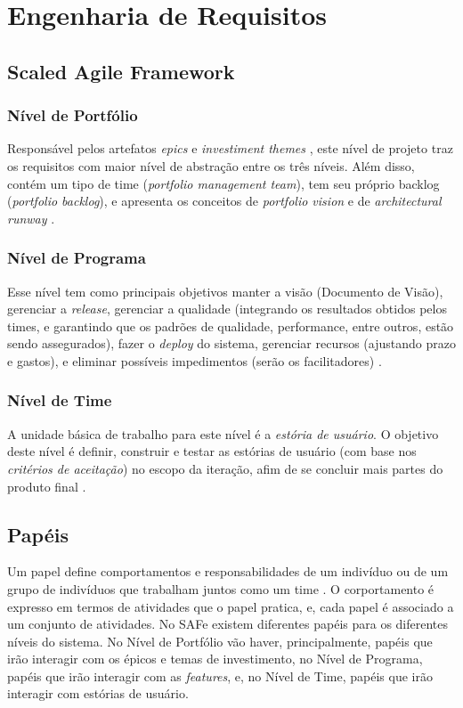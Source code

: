 \chapter[Engenharia de Requisitos]{Engenharia de Requisitos}

\section{Scaled Agile Framework}
\subsection{Nível de Portfólio}
Responsável pelos artefatos \emph{epics} e \emph{investiment themes} \cite[p. 227-228]{safe005}, este nível de projeto traz os requisitos com maior nível de abstração entre os três níveis. Além disso, contém um tipo de time (\emph{portfolio management team}), tem seu próprio backlog (\emph{portfolio backlog}), e apresenta os conceitos de \emph{portfolio vision} e de \emph{architectural runway} \cite[p. 227-228]{safe005}.

\subsection{Nível de Programa}
Esse nível tem como principais objetivos manter a visão (Documento de Visão), gerenciar a \emph{release}, gerenciar a qualidade (integrando os resultados obtidos pelos times, e garantindo que os padrões de qualidade, performance, entre outros, estão sendo assegurados), fazer o \emph{deploy} do sistema, gerenciar recursos (ajustando prazo e gastos), e eliminar possíveis impedimentos (serão os facilitadores) \cite[p. 63-64]{safe002}.

\subsection{Nível de Time}
A unidade básica de trabalho para este nível é a \emph{estória de usuário}. O objetivo deste nível é definir, construir e testar as estórias de usuário (com base nos \emph{critérios de aceitação}) no escopo da iteração, afim de se concluir mais partes do produto final \cite[p. 47-48]{safe001}.

\section{Papéis}
Um papel define comportamentos e responsabilidades de um indivíduo ou de um grupo de indivíduos que trabalham juntos como um time \cite[p. 61-65]{kruchten002}. O corportamento é expresso em termos de atividades que o papel pratica, e, cada papel é associado a um conjunto de atividades. No SAFe existem diferentes papéis para os diferentes níveis do sistema. No Nível de Portfólio vão haver, principalmente, papéis que irão interagir com os épicos e temas de investimento, no Nível de Programa, papéis que irão interagir com as \emph{features}, e, no Nível de Time, papéis que irão interagir com estórias de usuário.

